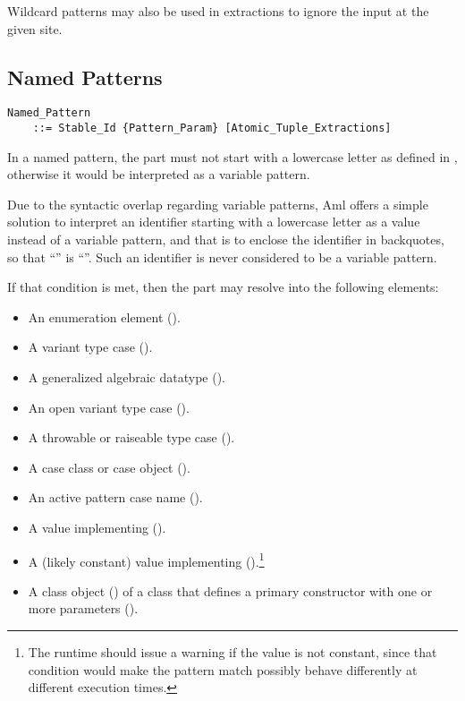 Wildcard patterns may also be used in extractions to ignore the input at the given site. 





\subsection{Named Patterns}
\label{sec:named-patterns}

\grammar\begin{lstlisting}
Named_Pattern 
    ::= Stable_Id {Pattern_Param} [Atomic_Tuple_Extractions]
\end{lstlisting}

In a named pattern, the  part must not start with a lowercase letter as defined in , otherwise it would be interpreted as a variable pattern. 

Due to the syntactic overlap regarding variable patterns, Aml offers a simple solution to interpret an identifier starting with a lowercase letter as a value instead of a variable pattern, and that is to enclose the identifier in backquotes, so that ``'' is ``''. Such an identifier is never considered to be a variable pattern. 

If that condition is met, then the  part may resolve into the following elements:
\begin{itemize}
  \item An enumeration element (). 
  \item A variant type case (). 
  \item A generalized algebraic datatype (). 
  \item An open variant type case (). 
  \item A throwable or raiseable type case (). 
  \item A case class or case object (). 
  \item An active pattern case name (). 
  \item A value implementing  ().
  \item A (likely constant) value implementing  ().\footnote{The runtime should issue a warning if the value is not constant, since that condition would make the pattern match possibly behave differently at different execution times.}
  \item A class object () of a class that defines a primary constructor with one or more parameters ().
\end{itemize}

